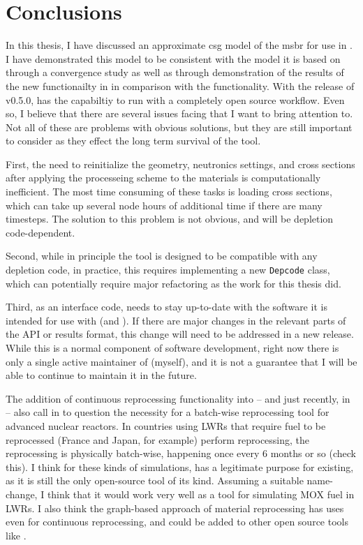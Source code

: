 \chapter{Conclusions}
\label{ch:chapter6}

In this thesis, I have discussed an approximate \Gls{csg} model of the
\Gls{msbr} for use in \OpenMC. I have demonstrated this model to be consistent
with the \SerpentTWO model it is based on through a convergence study as well as
through demonstration of the results of the new \OpenMC functionailty in
\SaltProc in comparison with the \SerpentTWO functionality.
With the release of v0.5.0, \SaltProc has the capabiltiy to run
with a completely open source workflow. Even so, I believe that there are several issues facing \SaltProc
that I want to bring attention to. Not all of these are problems with obvious
solutions, but they are still important to consider as they effect the long
term survival of the tool.

First, the need to reinitialize the geometry, neutronics
settings, and cross sections after applying the processeing scheme to the
materials is computationally inefficient. The most time consuming of these tasks
is loading cross sections, which can take up several node hours of additional
time if there are many timesteps. The solution to this problem is not obvious,
and will be depletion code-dependent.

Second, while in principle the tool is
designed to be compatible with any depletion code, in practice, this requires
implementing a new \verb.Depcode. class, which can potentially require major
refactoring as the work for this thesis did.

Third, as an interface code, \SaltProc needs to stay up-to-date with the
software it is intended for use with (\OpenMC and \SerpentTWO). If there are
major changes in the relevant parts of the API or results format, this change
will need to be addressed in a new \SaltProc release. While this is a normal
component of software development, right now there is only a single active
maintainer of \SaltProc (myself), and it is not a guarantee that I will
be able to continue to maintain it in the future.

The addition of continuous reprocessing functionality into \SerpentTWO -- and 
just recently, in  \OpenMC -- also call in to question the necessity for a
batch-wise reprocessing tool for advanced nuclear reactors. In countries using
LWRs that require fuel to be reprocessed (France and Japan, for example) perform
reprocessing, the reprocessing is physically batch-wise, happening once every 6
months or so (check this). I think for these kinds of simulations, \SaltProc
has a legitimate purpose for existing, as it is still the only open-source tool
of its kind. Assuming a suitable name-change, I think that it would work very
well as a tool for simulating MOX fuel in LWRs. I also think the graph-based
approach of material reprocessing has uses even for continuous reprocessing,
and could be added to other open source tools like \OpenMC.

